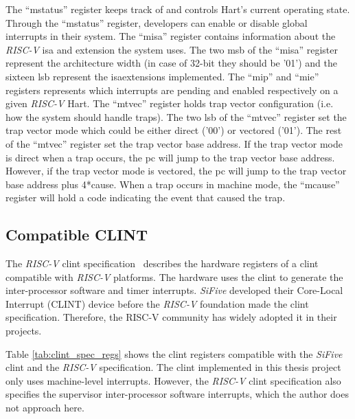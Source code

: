 The \enquote{mstatus} register keeps track of and controls Hart's current operating state. Through the \enquote{mstatus} register, developers can enable or disable global interrupts in their system. The \enquote{misa} register contains information about the \textit{RISC-V} \acrshort{isa} and extension the system uses. The two \acrfull{msb} of the \enquote{misa} register represent the architecture width (in case of 32-bit they should be '01') and the sixteen \acrfull{lsb} represent the \acrshort{isa}extensions implemented. The \enquote{mip} and \enquote{mie} registers represents which interrupts are pending and enabled respectively on a given \textit{RISC-V} Hart. The \enquote{mtvec} register holds trap vector configuration (i.e. how the system should handle traps). The two \acrshort{lsb} of the \enquote{mtvec} register set the trap vector mode which could be either direct ('00') or vectored ('01'). The rest of the \enquote{mtvec} register set the trap vector base address. If the trap vector mode is direct when a trap occurs, the \acrfull{pc} will jump to the trap vector base address. However, if the trap vector mode is vectored, the \acrfull{pc} will jump to the trap vector base address plus 4*cause. When a trap occurs in machine mode, the \enquote{mcause} register will hold a code indicating the event that caused the trap.

\subsection{Compatible CLINT}
\label{subsection:clint_riscv}
The \textit{RISC-V} \acrshort{clint} specification~\cite{clint_riscv_spec} describes the hardware registers of a \acrfull{clint} compatible with \textit{RISC-V} platforms. The hardware uses the \acrshort{clint} to generate the inter-processor software and timer interrupts. \textit{SiFive} developed their Core-Local Interrupt (CLINT) device before the \textit{RISC-V} foundation made the \acrshort{clint} specification. Therefore, the RISC-V community has widely adopted it in their projects.

Table \ref{tab:clint_spec_regs} shows the \acrshort{clint} registers compatible with the \textit{SiFive} \acrshort{clint} and the \textit{RISC-V} specification. The \acrshort{clint} implemented in this thesis project only uses machine-level interrupts. However, the \textit{RISC-V} \acrshort{clint} specification also specifies the supervisor inter-processor software interrupts, which the author does not approach here.

